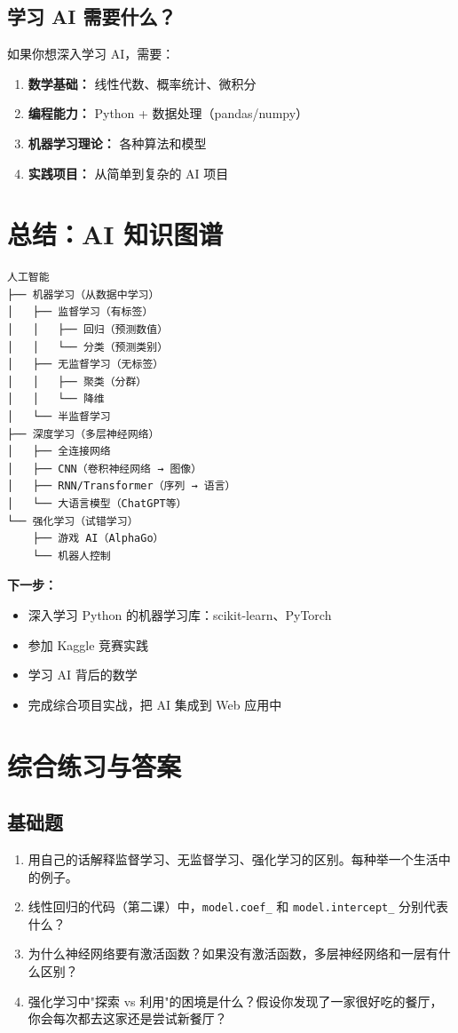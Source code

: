 \documentclass[a4paper,12pt]{ctexart}
\begin{document}
\subsection*{学习 AI 需要什么？}

如果你想深入学习 AI，需要：
\begin{enumerate}
  \item \textbf{数学基础：} 线性代数、概率统计、微积分
  \item \textbf{编程能力：} Python + 数据处理（pandas/numpy）
  \item \textbf{机器学习理论：} 各种算法和模型
  \item \textbf{实践项目：} 从简单到复杂的 AI 项目
\end{enumerate}

\section*{总结：AI 知识图谱}

\begin{verbatim}
人工智能
├── 机器学习（从数据中学习）
│   ├── 监督学习（有标签）
│   │   ├── 回归（预测数值）
│   │   └── 分类（预测类别）
│   ├── 无监督学习（无标签）
│   │   ├── 聚类（分群）
│   │   └── 降维
│   └── 半监督学习
├── 深度学习（多层神经网络）
│   ├── 全连接网络
│   ├── CNN（卷积神经网络 → 图像）
│   ├── RNN/Transformer（序列 → 语言）
│   └── 大语言模型（ChatGPT等）
└── 强化学习（试错学习）
    ├── 游戏 AI（AlphaGo）
    └── 机器人控制
\end{verbatim}

\textbf{下一步：}
\begin{itemize}
  \item 深入学习 Python 的机器学习库：scikit-learn、PyTorch
  \item 参加 Kaggle 竞赛实践
  \item 学习 AI 背后的数学
  \item 完成综合项目实战，把 AI 集成到 Web 应用中
\end{itemize}

\section*{综合练习与答案}

\subsection*{基础题}

\begin{enumerate}
  \item 用自己的话解释监督学习、无监督学习、强化学习的区别。每种举一个生活中的例子。
  \item 线性回归的代码（第二课）中，\texttt{model.coef\_} 和 \texttt{model.intercept\_} 分别代表什么？
  \item 为什么神经网络要有激活函数？如果没有激活函数，多层神经网络和一层有什么区别？
  \item 强化学习中"探索 vs 利用"的困境是什么？假设你发现了一家很好吃的餐厅，你会每次都去这家还是尝试新餐厅？
\end{enumerate}
\end{document}
